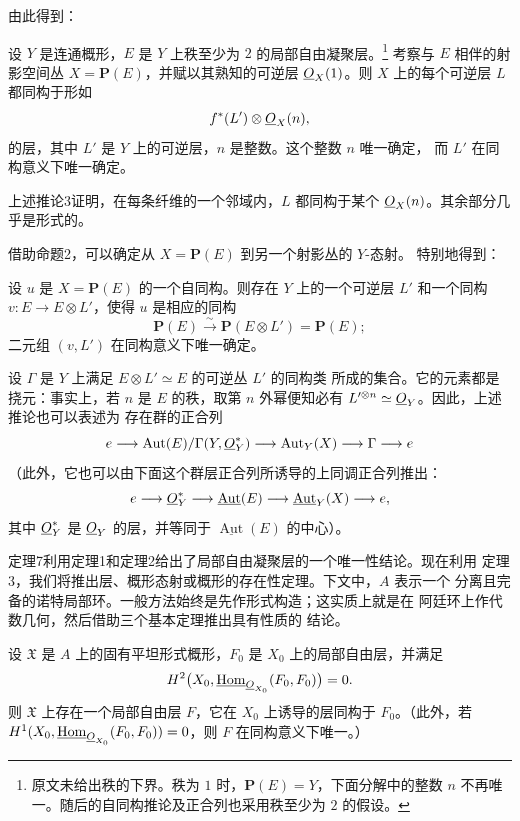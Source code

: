 由此得到：

 设 $Y$ 是连通概形，$E$ 是 $Y$ 上秩至少为 $2$ 的局部自由凝聚层。\footnote{原文未给出秩的下界。秩为 $1$ 时，$\mathbf P(E)=Y$，下面分解中的整数 $n$ 不再唯一。随后的自同构推论及正合列也采用秩至少为 $2$ 的假设。}
考察与 $E$ 相伴的射影空间丛 $X=\mathbf P(E)$，并赋以其熟知的可逆层
$\underline{O}_X(1)$。则 $X$ 上的每个可逆层 $L$ 都同构于形如
\[
  f^*(L')\otimes\underline{O}_X(n),
\]
的层，其中 $L'$ 是 $Y$ 上的可逆层，$n$ 是整数。这个整数 $n$ 唯一确定，
而 $L'$ 在同构意义下唯一确定。

上述推论3证明，在每条纤维的一个邻域内，$L$ 都同构于某个
$\underline{O}_X(n)$。其余部分几乎是形式的。

借助命题2，可以确定从 $X=\mathbf P(E)$ 到另一个射影丛的 $Y$-态射。
特别地得到：

 设 $u$ 是 $X=\mathbf P(E)$ 的一个自同构。则存在 $Y$
上的一个可逆层 $L'$ 和一个同构 $v:E\longrightarrow E\otimes L'$，使得
$u$ 是相应的同构
\[
  \mathbf P(E)\xrightarrow{\sim}\mathbf P(E\otimes L')=\mathbf P(E);
\]
二元组 $(v,L')$ 在同构意义下唯一确定。

设 $\Gamma$ 是 $Y$ 上满足 $E\otimes L'\simeq E$ 的可逆丛 $L'$ 的同构类
所成的集合。它的元素都是挠元：事实上，若 $n$ 是 $E$ 的秩，取第 $n$
外幂便知必有 $L'^{\otimes n}\simeq\underline{O}_Y$。因此，上述推论也可以表述为
存在群的正合列
\[
  e\longrightarrow
  \operatorname{Aut}(E)/\Gamma(Y,\underline{O}_Y^*)
  \longrightarrow \operatorname{Aut}_Y(X)
  \longrightarrow \Gamma\longrightarrow e
\]
（此外，它也可以由下面这个群层正合列所诱导的上同调正合列推出：
\[
  e\longrightarrow \underline{O}_Y^*
  \longrightarrow \underline{\operatorname{Aut}}(E)
  \longrightarrow \underline{\operatorname{Aut}}_Y(X)
  \longrightarrow e,
\]
其中 $\underline{O}_Y^*$ 是 $\underline{O}_Y$ 的层，并等同于
$\underline{\operatorname{Aut}}(E)$ 的中心）。


定理7利用定理1和定理2给出了局部自由凝聚层的一个唯一性结论。现在利用
定理3，我们将推出层、概形态射或概形的存在性定理。下文中，$A$ 表示一个
分离且完备的诺特局部环。一般方法始终是先作形式构造；这实质上就是在
阿廷环上作代数几何，然后借助三个基本定理推出具有性质的
结论。

 设 $\mathfrak X$ 是 $A$ 上的固有平坦形式概形，$F_0$
是 $X_0$ 上的局部自由层，并满足
\[
  H^2\bigl(X_0,\underline{\operatorname{Hom}}_{\underline{O}_{X_0}}(F_0,F_0)\bigr)=0.
\]
则 $\mathfrak X$ 上存在一个局部自由层 $F$，它在 $X_0$ 上诱导的层同构于
$F_0$。（此外，若
$H^1(X_0,\underline{\operatorname{Hom}}_{\underline{O}_{X_0}}(F_0,F_0))=0$，则 $F$ 在同构意义下唯一。）

